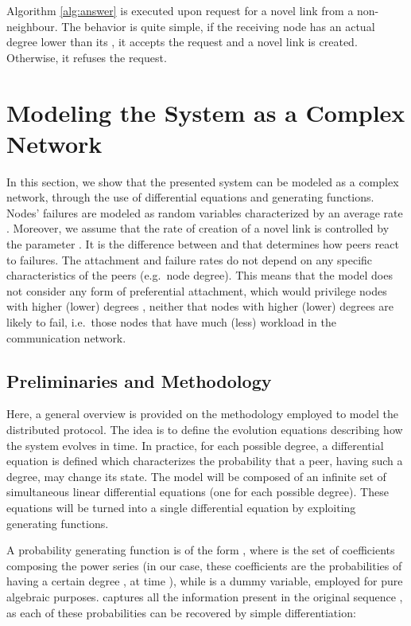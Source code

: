 \documentclass[a4paper,twosided]{article}
\begin{document}
Algorithm \ref{alg:answer} is executed upon request for a novel link from a non-neighbour. The behavior is quite simple, if the receiving node has an actual degree lower than its , it accepts the request and a novel link is created. Otherwise, it refuses the request.


\section{Modeling the System as a Complex Network}
\label{sec:model}


In this section, we show that the presented system can be modeled as a complex network, through the use of differential equations and generating functions. 
Nodes' failures are modeled as random variables characterized by an average rate . Moreover, we assume that
the rate of creation of a novel link is controlled by the parameter . It is the difference between  and  that determines how peers react to failures. The attachment and failure rates  do not depend on any specific characteristics of the peers (e.g.~node degree). 
This means that the model does not consider any form of preferential attachment, which would privilege nodes with higher (lower) degrees \cite{Newman03thestructure}, neither that nodes with higher (lower) degrees are likely to fail, i.e.~those nodes that have much (less) workload in the communication network. 




\subsection{Preliminaries and Methodology}

Here, a general overview is provided on the methodology employed to model the distributed protocol. 
The idea is to define the evolution equations describing how the system evolves in time. In practice, for each possible degree, a differential equation is defined which characterizes the probability that a peer, having such a degree, may change its state.
The model will be composed of an infinite set of simultaneous linear differential equations (one for each possible degree). These equations will be turned into a single differential equation by exploiting generating functions.

A probability generating function is of the form , where  is the set of coefficients composing the power series (in our case, these coefficients are the probabilities of having a certain degree , at time ), while  is a dummy variable, employed for pure algebraic purposes. 
 captures all the information present in the original sequence , as each of these probabilities can be recovered by simple differentiation:
\end{document}
